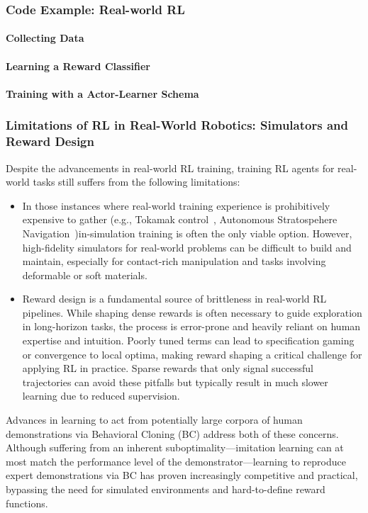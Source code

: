 \subsubsection{Code Example: Real-world RL}

\paragraph{Collecting Data}\label{paragraph:collecting-data}

\paragraph{Learning a Reward Classifier}

\paragraph{Training with a Actor-Learner Schema}


\subsubsection{Limitations of RL in Real-World Robotics: Simulators and Reward Design}

Despite the advancements in real-world RL training, training RL agents for real-world tasks still suffers from the following limitations:
\begin{itemize}
\item In those instances where real-world training experience is prohibitively expensive to gather (e.g., Tokamak control~\citep{degraveMagneticControlTokamak2022}, Autonomous Stratospehere Navigation~\citep{bellemareAutonomousNavigationStratospheric2020})in-simulation training is often the only viable option. 
However, high-fidelity simulators for real-world problems can be difficult to build and maintain, especially for contact-rich manipulation and tasks involving deformable or soft materials.

\item Reward design is a fundamental source of brittleness in real-world RL pipelines. While shaping dense rewards is often necessary to guide exploration in long-horizon tasks, the process is error-prone and heavily reliant on human expertise and intuition. Poorly tuned terms can lead to specification gaming or convergence to local optima, making reward shaping a critical challenge for applying RL in practice. Sparse rewards that only signal successful trajectories can avoid these pitfalls but typically result in much slower learning due to reduced supervision.
\end{itemize}

Advances in learning to act from potentially large corpora of human demonstrations via Behavioral Cloning (BC) address both of these concerns.
Although suffering from an inherent suboptimality---imitation learning can at most match the performance level of the demonstrator---learning to reproduce expert demonstrations via BC has proven increasingly competitive and practical, bypassing the need for simulated environments and hard-to-define reward functions.
